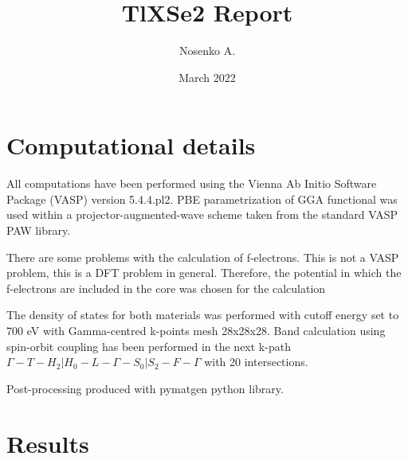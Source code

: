 \documentclass[a4paper,12pt]{report}
\title{TlXSe2 Report}
\author{Nosenko A.}
\date{March 2022}
\begin{document}
\maketitle
\tableofcontents
\chapter{Computational details}

All computations have been performed using the Vienna Ab Initio Software Package (VASP) version 5.4.4.pl2. PBE parametrization of GGA functional was used within a projector-augmented-wave scheme taken from the standard VASP PAW library.

There are some problems with the calculation of f-electrons. This is not a VASP problem, this is a DFT problem in general. Therefore, the potential in which the f-electrons are included in the core was chosen for the calculation

The density of states for both materials was performed with cutoff energy set to 700 eV with Gamma-centred k-points mesh 28x28x28. Band calculation using spin-orbit coupling has been performed in the next k-path $\Gamma-T-H_2|H_0-L-\Gamma-S_0|S_2-F-\Gamma$ with 20 intersections.

Post-processing produced with pymatgen python library.
 
\chapter{Results}


\end{document}
